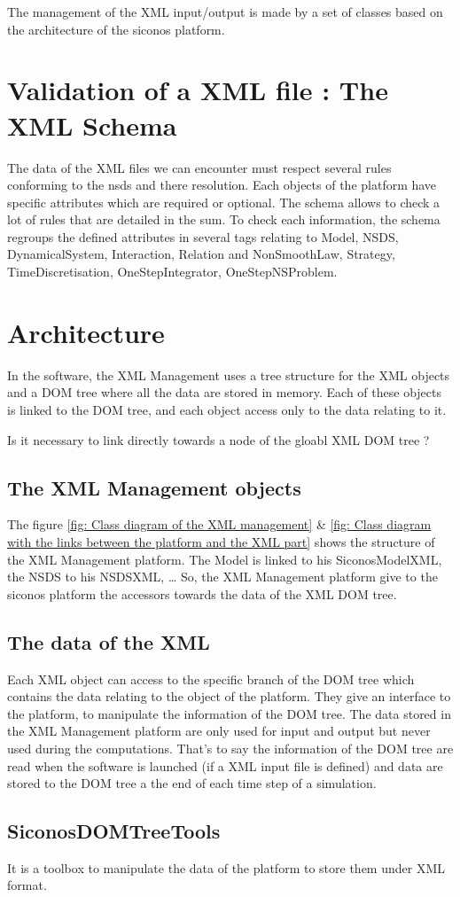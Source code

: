 

The management of the XML input/output is made by a set of classes based on the architecture of the
\ac{siconos} platform.

\section{Validation of a XML file : The XML Schema}
The data of the XML files we can encounter must respect several rules conforming to the \ac{nsds}
and there resolution. Each objects of the platform have specific attributes which are required
or optional. The schema allows to check a lot of rules that are detailed in the \ac{sum}.
To check each information, the schema regroups the defined attributes in several tags relating to
Model, NSDS, DynamicalSystem, Interaction, Relation and NonSmoothLaw, Strategy, TimeDiscretisation,
OneStepIntegrator, OneStepNSProblem.

\section{Architecture}
In the software, the XML Management uses a tree structure for the XML objects and a DOM tree where all the data are stored in memory. Each of these objects is linked to the DOM tree, and each object access only to the data relating to it.

\begin{ndr}
  Is it necessary to link directly towards a node of the gloabl XML DOM tree ?
\end{ndr}

\subsection{The XML Management objects}
The figure \ref{fig: Class diagram of the XML management} \& \ref{fig: Class diagram with the links between the platform and the XML part} shows the
structure of the XML Management platform.
The Model is linked to his SiconosModelXML, the NSDS to his NSDSXML, \dots
So, the XML Management platform give to the \ac{siconos} platform the accessors towards the data of the XML DOM tree.
\subsection{The data of the XML}
Each XML object can access to the specific branch of the DOM tree which contains the data relating to
the object of the platform. They give an interface to the platform, to manipulate the information of
the DOM tree.
The data stored in the XML Management platform are only used for input and output but never used during the
computations. That's to say the information of the DOM tree are read when the software is launched (if a XML input file is
defined) and data are stored to the DOM tree a the end of each time step of a simulation.
\subsection{SiconosDOMTreeTools}
It is a toolbox to manipulate the data of the platform to store them under XML format.

